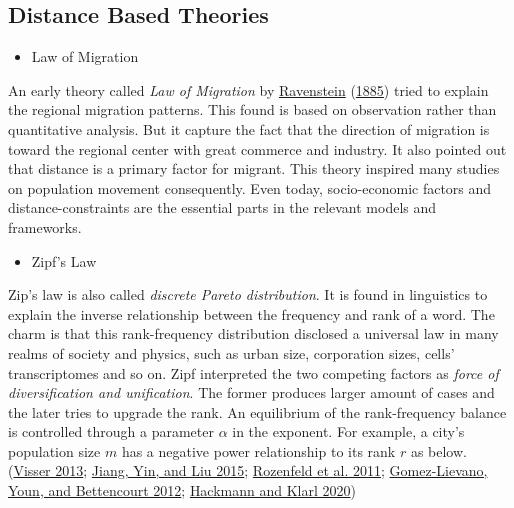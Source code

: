 \documentclass[
  11pt,
  openany]{memoir}
\providecommand{\tightlist}{%
  \setlength{\itemsep}{0pt}\setlength{\parskip}{0pt}}
\begin{document}
\hypertarget{distance-based-theories}{%
\subsection{Distance Based Theories}\label{distance-based-theories}}

\begin{itemize}
\tightlist
\item
  Law of Migration
\end{itemize}

An early theory called \emph{Law of Migration} by \protect\hyperlink{ref-ravensteinLawsMigration1885}{Ravenstein} (\protect\hyperlink{ref-ravensteinLawsMigration1885}{1885}) tried to explain the regional migration patterns. This found is based on observation rather than quantitative analysis. But it capture the fact that the direction of migration is toward the regional center with great commerce and industry. It also pointed out that distance is a primary factor for migrant. This theory inspired many studies on population movement consequently. Even today, socio-economic factors and distance-constraints are the essential parts in the relevant models and frameworks.

\begin{itemize}
\tightlist
\item
  Zipf's Law
\end{itemize}

Zip's law is also called \emph{discrete Pareto distribution}. It is found in linguistics to explain the inverse relationship between the frequency and rank of a word. The charm is that this rank-frequency distribution disclosed a universal law in many realms of society and physics, such as urban size, corporation sizes, cells' transcriptomes and so on. Zipf interpreted the two competing factors as \emph{force of diversification and unification}. The former produces larger amount of cases and the later tries to upgrade the rank. An equilibrium of the rank-frequency balance is controlled through a parameter \(\alpha\) in the exponent. For example, a city's population size \(m\) has a negative power relationship to its rank \(r\) as below. (\protect\hyperlink{ref-visserZipfLawPower2013}{Visser 2013}; \protect\hyperlink{ref-jiangZipfLawAll2015}{Jiang, Yin, and Liu 2015}; \protect\hyperlink{ref-rozenfeldAreaPopulationCities2011}{Rozenfeld et al. 2011}; \protect\hyperlink{ref-gomez-lievanoStatisticsUrbanScaling2012}{Gomez-Lievano, Youn, and Bettencourt 2012}; \protect\hyperlink{ref-hackmannEvolutionZipfLaw2020}{Hackmann and Klarl 2020})
\end{document}
